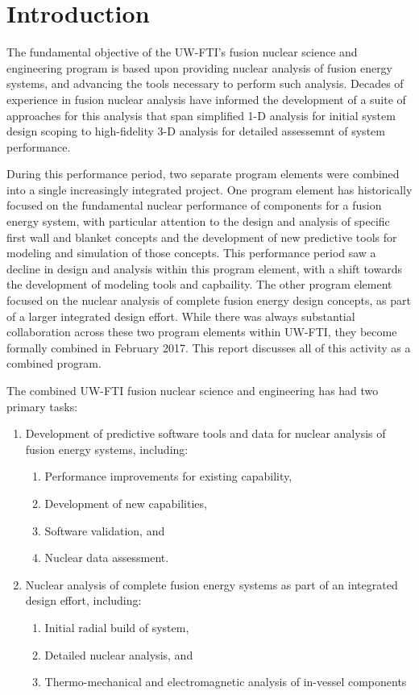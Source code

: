 \section{Introduction}

The fundamental objective of the \gls{UW-FTI}'s fusion nuclear science and
engineering program is based upon providing nuclear analysis of fusion energy
systems, and advancing the tools necessary to perform such analysis.  Decades
of experience in fusion nuclear analysis have informed the development of a
suite of approaches for this analysis that span simplified 1-D analysis for
initial system design scoping to high-fidelity 3-D analysis for detailed
assessemnt of system performance.

During this performance period, two separate program elements were combined
into a single increasingly integrated project.  One program element has
historically focused on the fundamental nuclear performance of components for
a fusion energy system, with particular attention to the design and analysis
of specific first wall and blanket concepts and the development of new
predictive tools for modeling and simulation of those concepts.  This
performance period saw a decline in design and analysis within this program
element, with a shift towards the development of modeling tools and
capbaility.  The other program element focused on the nuclear analysis of
complete fusion energy design concepts, as part of a larger integrated design
effort.  While there was always substantial collaboration across these two
program elements within \gls{UW-FTI}, they become formally combined in
February 2017.  This report discusses all of this activity as a combined
program.

The combined \gls{UW-FTI} fusion nuclear science and engineering has had two
primary tasks:
\begin{enumerate}
\item Development of predictive software tools and data for nuclear analysis
  of fusion energy systems, including:
  \begin{enumerate}
  \item Performance improvements for existing capability,
  \item Development of new capabilities,
  \item Software validation, and
  \item Nuclear data assessment.
  \end{enumerate}
\item Nuclear analysis of complete fusion energy systems as part of an
  integrated design effort, including:
  \begin{enumerate}
  \item Initial radial build of system,
  \item Detailed nuclear analysis, and
  \item Thermo-mechanical and electromagnetic analysis of in-vessel components
  \end{enumerate}
\end{enumerate}

